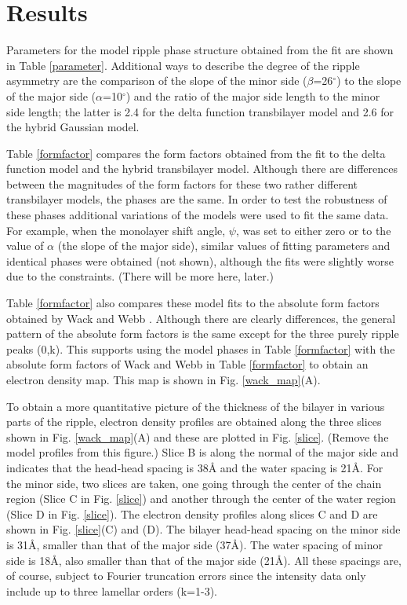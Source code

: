 \section{Results}

Parameters for the model ripple phase structure obtained from the fit
are shown in Table \ref{parameter}.  Additional ways to describe the degree
of the ripple asymmetry are the comparison of
the slope of the minor side ($\beta$=26$^{\circ}$) to the slope of
the major side ($\alpha$=10$^{\circ}$) and the 
ratio of the major side length to the minor side length; the latter
is 2.4 for the delta function transbilayer model and 2.6 for the hybrid
Gaussian model.

Table \ref{formfactor} compares the form factors obtained from the fit to
the delta function model and the hybrid transbilayer model.
Although there are differences between the magnitudes of the form factors 
for these two rather different transbilayer models, the phases are the same.  
In order to test the robustness of these phases 
additional variations of the models were used to fit the same data.
For example, when the monolayer shift angle, $\psi$, was set to either zero or
to the value of $\alpha$ (the slope of the major side), 
similar values of fitting
parameters and identical phases were obtained (not shown), although
the fits were slightly worse due to the constraints. 
(There will be more here, later.)

Table \ref{formfactor} also compares these model fits to
the absolute form factors obtained by Wack and Webb \cite{Wac89a}.
Although there are clearly differences, the general pattern of the
absolute form factors is the same except for the three purely ripple
peaks (0,k).  This supports using 
the model phases in Table \ref{formfactor} with the absolute form
factors of Wack and Webb in Table \ref{formfactor} to obtain
an electron density map.  This map is shown in Fig. \ref{wack_map}(A).

To obtain a more quantitative picture of the thickness of the
bilayer in various parts of the ripple, electron density profiles
are obtained along the three slices shown in Fig. \ref{wack_map}(A) 
and these are plotted in Fig. \ref{slice}.  (Remove the model
profiles from this figure.)  Slice B is along the normal of the
major side and indicates that the head-head spacing is 38\AA
and the water spacing is 21\AA.  For the minor side, two slices are taken,
one going through the center of the chain region (Slice C in
Fig. \ref{slice}) and another through the center of the water
region (Slice D in Fig. \ref{slice}). The electron density
profiles along slices C and D are shown in Fig. \ref{slice}(C) and
(D). The bilayer head-head spacing on the minor side is 31\AA, smaller
than that of the major side (37\AA). The water spacing of minor side
is 18\AA, also smaller than that of the major side (21\AA). 
All these spacings are, of course, subject to Fourier truncation
errors since the intensity data only include
up to three lamellar orders (k=1-3).

